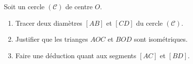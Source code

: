 \begin{exercice*}[Cercle]
    Soit un cercle $(\mathcal{C})$ de centre $O$.


        \begin{enumerate}
            \item Tracer deux diamètres $[AB]$ et $[CD]$ du cercle $(\mathcal{C})$.
            \item Justifier que les trianges $AOC$ et $BOD$ sont isométriques.
            \item Faire une déduction quant aux segments $[AC]$ et $[BD]$.
        \end{enumerate}
\end{exercice*}
